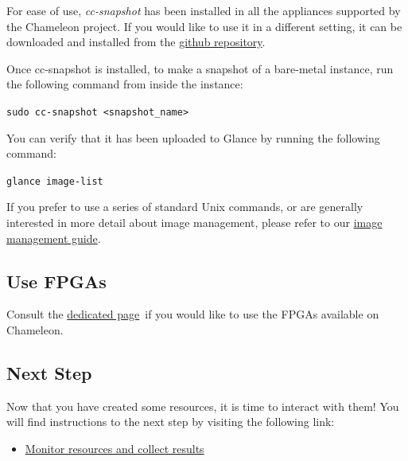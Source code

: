{For ease of use, \emph{cc-snapshot} has been installed in all the
appliances supported by the Chameleon project. If you would like to use
it in a different setting, it can be downloaded and installed from the
\href{https://github.com/ChameleonCloud/ChameleonSnapshotting}{github
repository}.}

{Once cc-snapshot is installed, to make a snapshot of a bare-metal
instance, run the following command from inside the instance:}

{\texttt{sudo\ cc-snapshot\ \textless{}snapshot\_name\textgreater{}}}

{You can verify that it has been uploaded to Glance by running the
following command:}

{\texttt{glance\ image-list}}

{If you prefer to use a series of standard Unix commands, or are
generally interested in more detail about image management, please refer
to our
\href{https://www.chameleoncloud.org/docs/user-guides/ironic/\#snapshotting_an_instance}{image
management guide}.}

\subsection{Use FPGAs}

Consult the
\href{https://www.chameleoncloud.org/docs/bare-metal-user-guide/fpga/}{dedicated
page}~if you would like to use the FPGAs available on Chameleon.

\subsection{Next Step}

Now that you have created some resources, it is time to interact with
them! You will find instructions to the next step by visiting the
following link:

\begin{itemize}

\item
  \href{https://www.chameleoncloud.org/monitor-and-collect/}{Monitor
  resources and collect results}
\end{itemize}

